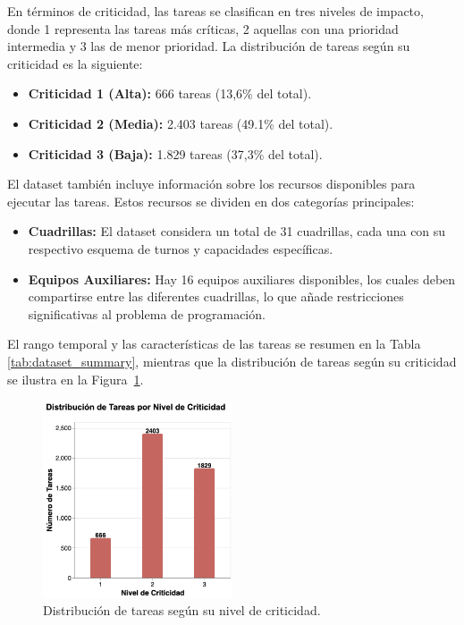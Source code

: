 \documentclass{article}
\begin{document}
En términos de criticidad, las tareas se clasifican en tres niveles de impacto, donde 1 representa las tareas más críticas, 2 aquellas con una prioridad intermedia y 3 las de menor prioridad. La distribución de tareas según su criticidad es la siguiente:
\begin{itemize}
    \item \textbf{Criticidad 1 (Alta):} 666 tareas (13,6\% del total).
    \item \textbf{Criticidad 2 (Media):} 2.403 tareas (49.1\% del total).
    \item \textbf{Criticidad 3 (Baja):} 1.829 tareas (37,3\% del total).
\end{itemize}

El dataset también incluye información sobre los recursos disponibles para ejecutar las tareas. Estos recursos se dividen en dos categorías principales:
\begin{itemize}
    \item \textbf{Cuadrillas:} El dataset considera un total de 31 cuadrillas, cada una con su respectivo esquema de turnos y capacidades específicas.
    \item \textbf{Equipos Auxiliares:} Hay 16 equipos auxiliares disponibles, los cuales deben compartirse entre las diferentes cuadrillas, lo que añade restricciones significativas al problema de programación.
\end{itemize}

El rango temporal y las características de las tareas se resumen en la Tabla \ref{tab:dataset_summary}, mientras que la distribución de tareas según su criticidad se ilustra en la Figura~\ref{fig:barras_impacto}.


\begin{figure}[htbp]
    \centering
    \includegraphics[width=0.5\textwidth]{imgs/barras_impacto.png}
    \caption{Distribución de tareas según su nivel de criticidad.}
    \label{fig:barras_impacto}
\end{figure}
\end{document}
